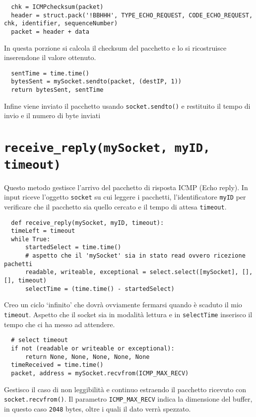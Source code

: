 \documentclass[a4paper,12pt]{report}
\begin{document}
\begin{verbatim}
  chk = ICMPchecksum(packet)
  header = struct.pack('!BBHHH', TYPE_ECHO_REQUEST, CODE_ECHO_REQUEST, chk, identifier, sequenceNumber)
  packet = header + data
\end{verbatim}
In questa porzione si calcola il checksum del pacchetto e lo si ricostruisce inserendone il valore ottenuto.
\begin{verbatim}
  sentTime = time.time()
  bytesSent = mySocket.sendto(packet, (destIP, 1))
  return bytesSent, sentTime
\end{verbatim}
Infine viene inviato il pacchetto usando \texttt{socket.sendto()} e restituito il tempo di invio e il numero di byte inviati
\section{\texttt{receive\_reply(mySocket, myID, timeout)}}
Questo metodo gestisce l'arrivo del pacchetto di risposta ICMP (Echo reply).
%
In input riceve l'oggetto \texttt{socket} su cui leggere i pacchetti, l'identificatore \texttt{myID} per verificare che il pacchetto sia quello cercato e il tempo di attesa \texttt{timeout}.
%
\begin{verbatim}
  def receive_reply(mySocket, myID, timeout):
  timeLeft = timeout
  while True:
      startedSelect = time.time()
      # aspetto che il 'mySocket' sia in stato read ovvero ricezione pachetti
      readable, writeable, exceptional = select.select([mySocket], [], [], timeout)
      selectTime = (time.time() - startedSelect)
\end{verbatim}
Creo un ciclo `infinito' che dovrà ovviamente fermarsi quando è scaduto il mio \texttt{timeout}.
%
Aspetto che il socket sia in modalità lettura e in \texttt{selectTime} inserisco il tempo che ci ha messo ad attendere.
\begin{verbatim}
  # select timeout
  if not (readable or writeable or exceptional):
      return None, None, None, None, None 
  timeReceived = time.time()
  packet, address = mySocket.recvfrom(ICMP_MAX_RECV)
\end{verbatim}
Gestisco il caso di non leggibilità e continuo estraendo il pacchetto ricevuto con \texttt{socket.recvfrom()}.
%
Il parametro \texttt{ICMP\_MAX\_RECV} indica la dimensione del buffer, in questo caso \texttt{2048} bytes, oltre i quali il dato verrà spezzato.
\end{document}
